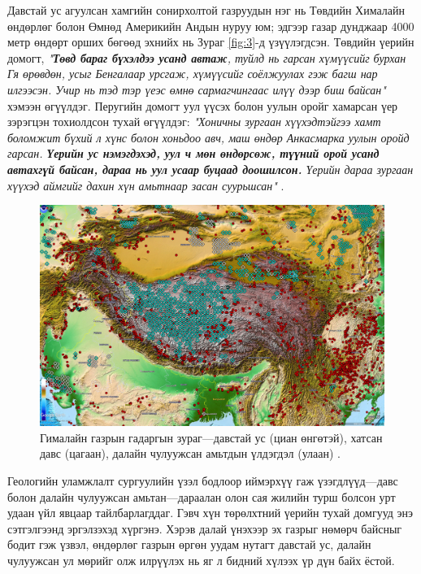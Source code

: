 \documentclass[10pt,twocolumn,letterpaper]{article}
\begin{document}
Давстай ус агуулсан хамгийн сонирхолтой газруудын нэг нь Төвдийн Хималайн өндөрлөг болон Өмнөд Америкийн Андын нуруу юм; эдгээр газар дунджаар 4000 метр өндөрт орших бөгөөд эхнийх нь Зураг \ref{fig:3}-д үзүүлэгдсэн. Төвдийн үерийн домогт, \textit{"\textbf{Төвд бараг бүхэлдээ усанд автаж}, туйлд нь гарсан хүмүүсийг бурхан Гя өрөвдөн, усыг Бенгалаар урсгаж, хүмүүсийг соёлжуулах гэж багш нар илгээсэн. Учир нь тэд тэр үеэс өмнө сармагчингаас илүү дээр биш байсан"} \cite{3} хэмээн өгүүлдэг. Перугийн домогт уул үүсэх болон уулын оройг хамарсан үер зэрэгцэн тохиолдсон тухай өгүүлдэг: \textit{"Хоничны зургаан хүүхэдтэйгээ хамт боломжит бүхий л хүнс болон хоньдоо авч, маш өндөр Анкасмарка уулын оройд гарсан. \textbf{Үерийн ус нэмэгдэхэд, уул ч мөн өндөрсөж, түүний орой усанд автахгүй байсан, дараа нь уул усаар буцаад доошилсон.} Үерийн дараа зургаан хүүхэд аймгийг дахин хүн амьтнаар засан суурьшсан"} \cite{3}.
\begin{figure}[t]
\begin{center}
   \includegraphics[width=1\linewidth]{tibet.jpg}
\end{center}
   \caption{Гималайн газрын гадаргын зураг—давстай ус (циан өнгөтэй), хатсан давс (цагаан), далайн чулуужсан амьтдын үлдэгдэл (улаан) \cite{15,16,86,87}.}
\label{fig:3}
\label{fig:onecol}
\end{figure}

Геологийн уламжлалт сургуулийн үзэл бодлоор иймэрхүү гаж үзэгдлүүд—давс болон далайн чулуужсан амьтан—дараалан олон сая жилийн турш болсон урт удаан үйл явцаар тайлбарлагддаг. Гэвч хүн төрөлхтний үерийн тухай домгууд энэ сэтгэлгээнд эргэлзэхэд хүргэнэ. Хэрэв далай үнэхээр эх газрыг нөмөрч байсныг бодит гэж үзвэл, өндөрлөг газрын өргөн уудам нутагт давстай ус, далайн чулуужсан ул мөрийг олж илрүүлэх нь яг л бидний хүлээх үр дүн байх ёстой.
\end{document}
